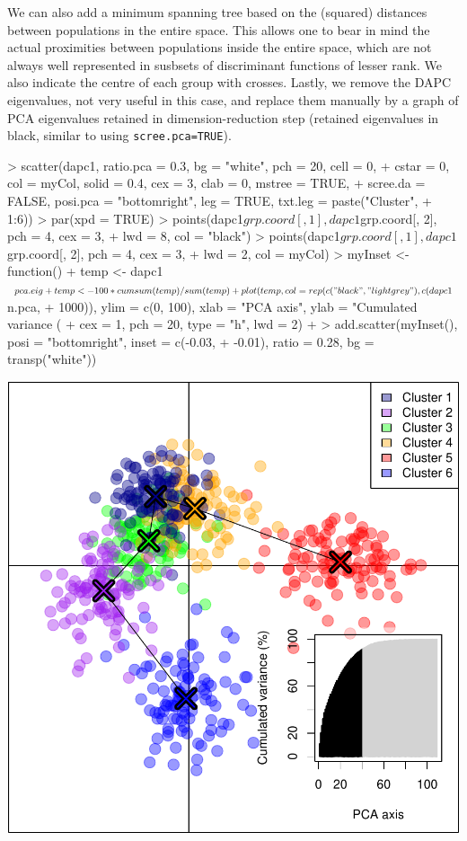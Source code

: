 \documentclass{article}
\begin{document}
We can also add a minimum spanning tree based on the (squared) distances between populations in the
entire space.
This allows one to bear in mind the actual proximities between populations inside the entire space, which are not always
well represented in susbsets of discriminant functions of lesser rank.
We also indicate the centre of each group with crosses.
Lastly, we remove the DAPC eigenvalues, not very useful in this case, and replace them manually by a graph of
PCA eigenvalues retained in dimension-reduction step (retained eigenvalues in black, similar to
using \texttt{scree.pca=TRUE}).
\begin{Schunk}
\begin{Sinput}
> scatter(dapc1, ratio.pca = 0.3, bg = "white", pch = 20, cell = 0, 
+     cstar = 0, col = myCol, solid = 0.4, cex = 3, clab = 0, mstree = TRUE, 
+     scree.da = FALSE, posi.pca = "bottomright", leg = TRUE, txt.leg = paste("Cluster", 
+         1:6))
> par(xpd = TRUE)
> points(dapc1$grp.coord[, 1], dapc1$grp.coord[, 2], pch = 4, cex = 3, 
+     lwd = 8, col = "black")
> points(dapc1$grp.coord[, 1], dapc1$grp.coord[, 2], pch = 4, cex = 3, 
+     lwd = 2, col = myCol)
> myInset <- function() {
+     temp <- dapc1$pca.eig
+     temp <- 100 * cumsum(temp)/sum(temp)
+     plot(temp, col = rep(c("black", "lightgrey"), c(dapc1$n.pca, 
+         1000)), ylim = c(0, 100), xlab = "PCA axis", ylab = "Cumulated variance (%
+         cex = 1, pch = 20, type = "h", lwd = 2)
+ }
> add.scatter(myInset(), posi = "bottomright", inset = c(-0.03, 
+     -0.01), ratio = 0.28, bg = transp("white"))
\end{Sinput}
\end{Schunk}
\includegraphics{figs/dapc-014}
\end{document}
